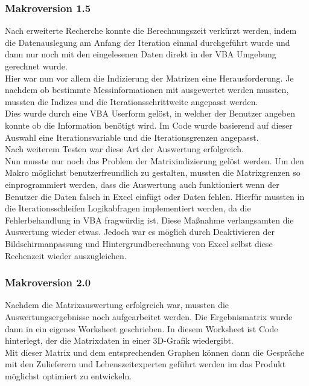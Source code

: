 \subsubsection{Makroversion 1.5}
\label{Makro1.5}

Nach erweiterte Recherche konnte die Berechnungszeit verkürzt werden, indem die Datenauslegung am Anfang der Iteration einmal durchgeführt wurde und dann nur noch mit den eingelesenen Daten direkt in der VBA Umgebung gerechnet wurde. \\
Hier war nun vor allem die Indizierung der Matrizen eine Herausforderung. Je nachdem ob bestimmte Messinformationen mit ausgewertet werden mussten, mussten die Indizes und die Iterationsschrittweite angepasst werden. \\
Dies wurde durch eine VBA Userform gelöst, in welcher der Benutzer angeben konnte ob die Information benötigt wird. Im Code wurde basierend auf dieser Auswahl eine Iterationsvariable und die Iterationsgrenzen angepasst. \\
Nach weiterem Testen war diese Art der Auswertung erfolgreich. \\

Nun musste nur noch das Problem der Matrixindizierung gelöst werden. Um den Makro möglichst benutzerfreundlich zu gestalten, mussten die Matrixgrenzen so einprogrammiert werden, dass die Auswertung auch funktioniert wenn der Benutzer die Daten falsch in Excel einfügt oder Daten fehlen. Hierfür mussten in die Iterationsschleifen Logikabfragen implementiert werden, da die Fehlerbehandlung in VBA fragwürdig ist. Diese Maßnahme verlangsamten die Auswertung wieder etwas. Jedoch war es möglich durch Deaktivieren der Bildschirmanpassung und Hintergrundberechnung von Excel selbst diese Rechenzeit wieder auszugleichen. \\

\subsubsection{Makroversion 2.0}
\label{Makro2.0}

Nachdem die Matrixauswertung erfolgreich war, mussten die Auswertungsergebnisse noch aufgearbeitet werden. Die Ergebnismatrix wurde dann in ein eigenes Worksheet geschrieben. In diesem Worksheet ist Code hinterlegt, der die Matrixdaten in einer 3D-Grafik wiedergibt. \\
Mit dieser Matrix und dem entsprechenden Graphen können dann die Gespräche mit den Zulieferern und Lebenszeitexperten geführt werden im das Produkt möglichst optimiert zu entwickeln.\\

